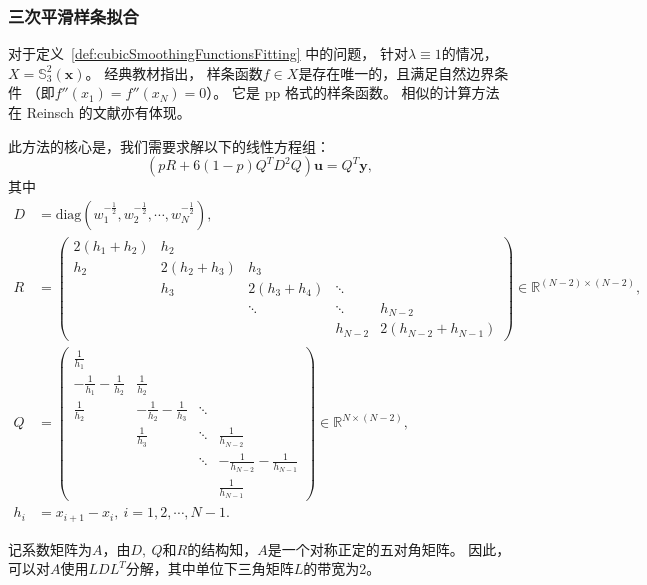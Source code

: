 \subsubsection{三次平滑样条拟合}
对于定义~\ref{def:cubicSmoothingFunctionsFitting} 中的问题，
针对$\lambda\equiv 1$的情况，$X=\mathbb{S}_{3}^{2}(\mathbf{x})$。
经典教材\cite{GuideToSplines}指出，
样条函数$f\in X$是存在唯一的，且满足自然边界条件
（即$f''(x_{1})=f''(x_{N})=0$）。
它是 pp 格式的样条函数。
相似的计算方法在 Reinsch
的文献\cite{SmoothingBySplineFunctions}亦有体现。

此方法的核心是，我们需要求解以下的线性方程组：
\begin{equation}
  \label{eq:cubicSmoothingSplineEquation}
  (pR+6(1-p)Q^{T}D^{2}Q)\mathbf{u}=Q^{T}\mathbf{y},
\end{equation}
其中
\begin{align*}
  D&=\text{diag}\left(w_{1}^{-\frac{1}{2}},w_{2}^{-\frac{1}{2}},\cdots,
  w_{N}^{-\frac{1}{2}}\right),\\
  R&=\left(
  \begin{array}{ccccc}
	2(h_1+h_2)& h_2&& &\\
	h_2& 2(h_2+h_3)& h_3&&\\
	& h_3  &2(h_3+h_4)  &\ddots&\\
	&&\ddots&\ddots&h_{N-2}\\
	&&& h_{N-2} &2(h_{N-2}+h_{N-1})
  \end{array}
  \right)\in \mathbb{R}^{(N-2)\times(N-2)},\\
   Q&=\left(
    \begin{array}{cccc}
      \frac{1}{h_1}& & &\\
      -\frac{1}{h_1}-\frac{1}{h_2}& \frac{1}{h_{2}}& &\\
      \frac{1}{h_2}& -\frac{1}{h_2}-\frac{1}{h_3}  &\ddots  &\\
                   &\frac{1}{h_{3}}&\ddots&\frac{1}{h_{N-2}}\\
                   &&\ddots&-\frac{1}{h_{N-2}}-\frac{1}{h_{N-1}}\\
      &&&\frac{1}{h_{N-1}}
    \end{array}
      \right)\in \mathbb{R}^{N\times (N-2)},\\
  h_{i}&=x_{i+1}-x_{i},\ i=1,2,\cdots,N-1.
\end{align*}

记系数矩阵为$A$，由$D,\ Q$和$R$的结构知，$A$是一个对称正定的五对角矩阵。
因此，可以对$A$使用$LDL^{T}$分解，其中单位下三角矩阵$L$的带宽为2。

